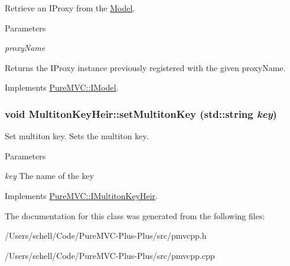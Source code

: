 Retrieve an {\ttfamily IProxy} from the {\ttfamily \hyperlink{class_pure_m_v_c_1_1_model}{Model}}. 
\begin{DoxyParams}{Parameters}
\item[{\em proxyName}]\end{DoxyParams}
\begin{DoxyReturn}{Returns}
the {\ttfamily IProxy} instance previously registered with the given {\ttfamily proxyName}. 
\end{DoxyReturn}


Implements \hyperlink{class_pure_m_v_c_1_1_i_model_a646757239d2d3e4f711f3738a68bfb06}{PureMVC::IModel}.\hypertarget{class_pure_m_v_c_1_1_multiton_key_heir_abc70ef7c066bc8d7bf0196ec727599bb}{
\subsubsection[{setMultitonKey}]{\setlength{\rightskip}{0pt plus 5cm}void MultitonKeyHeir::setMultitonKey (std::string {\em key})}}
\label{class_pure_m_v_c_1_1_multiton_key_heir_abc70ef7c066bc8d7bf0196ec727599bb}


Set multiton key. Sets the multiton key. 
\begin{DoxyParams}{Parameters}
\item[{\em key}]The name of the key \end{DoxyParams}


Implements \hyperlink{class_pure_m_v_c_1_1_i_multiton_key_heir_a03acb75ab79defba2c28b8de1bbe1ca6}{PureMVC::IMultitonKeyHeir}.

The documentation for this class was generated from the following files:\begin{DoxyCompactItemize}
\item 
/Users/schell/Code/PureMVC-\/Plus-\/Plus/src/pmvcpp.h\item 
/Users/schell/Code/PureMVC-\/Plus-\/Plus/src/pmvcpp.cpp\end{DoxyCompactItemize}
